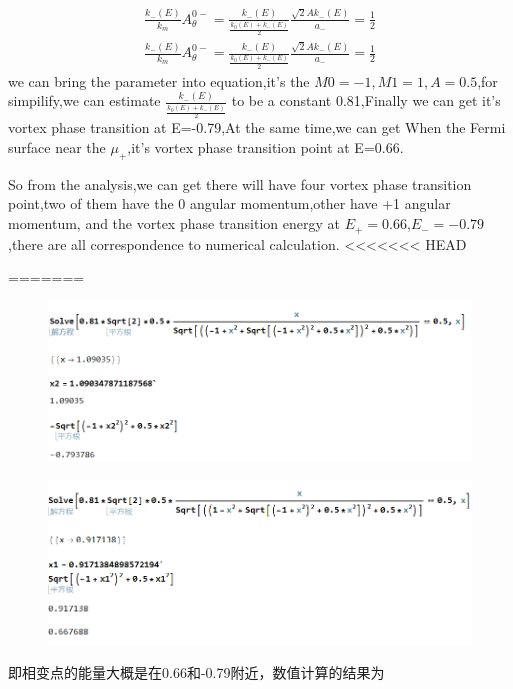\documentclass[4pt]{article}
\begin{document}
\begin{align}
	\frac{k_{-}(E)}{k_m}A_{\theta}^{0-}=\frac{k_{-}(E)}{\frac{k_{0}(E)+k_{-}(E)}{2}}\frac{\sqrt{2}Ak_{-}(E)}{a_{-}}=\frac{1}{2}
\end{align}
\begin{align}
	\frac{k_{-}(E)}{k_m}A_{\theta}^{0-}=\frac{k_{-}(E)}{\frac{k_{0}(E)+k_{-}(E)}{2}}\frac{\sqrt{2}Ak_{-}(E)}{a_{-}}=\frac{1}{2}
\end{align}
we can bring the parameter into equation,it's the $M0=-1,M1=1,A=0.5$,for simpilify,we can estimate $\frac{k_{-}(E)}{\frac{k_{0}(E)+k_{-}(E)}{2}}$ to be a constant 0.81,Finally we can get it's vortex phase transition at E=-0.79,At the same time,we can get When the Fermi surface near the $\mu_{+}$,it's vortex phase transition point at E=0.66.
\par 
So from the analysis,we can get there will have four vortex phase transition point,two of them have the 0 angular momentum,other have +1 angular momentum, and the vortex phase transition energy at $E_{+}=0.66$,$E_{-}=-0.79$,there are all correspondence to numerical calculation.
<<<<<<< HEAD
\par 
=======
\begin{figure}[H]
	\centering
	\includegraphics[scale=0.6]{figure/3}
\end{figure}
\begin{figure}[H]
	\centering
	\includegraphics[scale=0.6]{figure/4}
\end{figure}
即相变点的能量大概是在0.66和-0.79附近，数值计算的结果为
\end{document}
